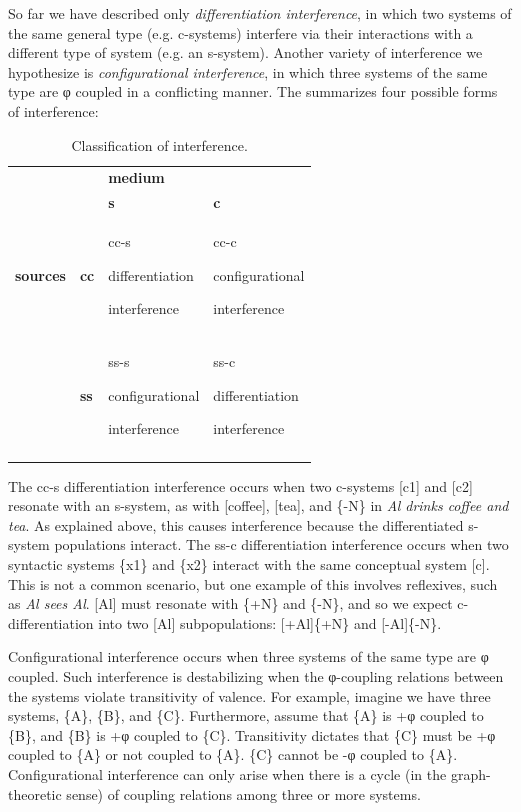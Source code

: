   So far we have described only \textit{differentiation interference}, in which two systems of the same general type (e.g. c-systems) interfere via their interactions with a different type of system (e.g. an s-system). Another variety of interference we hypothesize is \textit{configurational interference}, in which three systems of the same type are φ coupled in a conflicting manner. The {\tablebelow} summarizes four possible forms of interference:

\begin{table}
\begin{tabularx}{\textwidth}{llXX} 
\lsptoprule
&  & \textbf{medium} & \\
&  & \textbf{s} & \textbf{c}\\
\midrule 
\textbf{sources} & \textbf{cc} & cc-s

differentiation 

interference & cc-c

configurational

interference\\
\tablevspace
& \textbf{ss} & ss-s

configurational

interference & ss-c

differentiation

interference\\
\lspbottomrule
\end{tabularx}
\caption{Classification of interference.}\label{tab:4:2}
\end{table}
  The cc-s differentiation interference occurs when two c-systems [c1] and [c2] resonate with an s-system, as with [coffee], [tea], and \{-N\} in \textit{Al drinks coffee and tea}. As explained above, this causes interference because the differentiated s-system populations interact. The ss-c differentiation interference occurs when  two syntactic systems \{x1\} and \{x2\} interact with the same conceptual system [c]. This is not a common scenario, but one example of this involves reflexives, such as \textit{Al sees Al}. [Al] must resonate with \{+N\} and \{-N\}, and so we expect c-differentiation into two [Al] subpopulations: [+Al]\{+N\} and [-Al]\{-N\}.

  Configurational interference occurs when three systems of the same type are φ coupled. Such interference is destabilizing when the φ-coupling relations between the systems violate transitivity of valence. For example, imagine we have three systems, \{A\}, \{B\}, and \{C\}. Furthermore, assume that \{A\} is +φ coupled to \{B\}, and \{B\} is +φ coupled to \{C\}. Transitivity dictates that \{C\} must be +φ coupled to \{A\} or not coupled to \{A\}. \{C\} cannot be -φ coupled to \{A\}. Configurational interference can only arise when there is a cycle (in the graph-theoretic sense) of coupling relations among three or more systems. 

